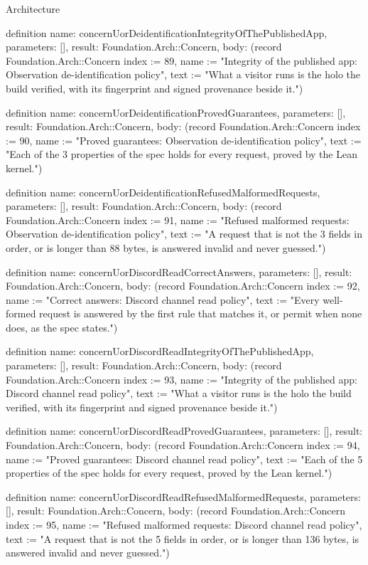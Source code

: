 \begin{lexlean}{Architecture}
\begin{semanticmodule}
definition{
  name: concernUorDeidentificationIntegrityOfThePublishedApp,
  parameters: [],
  result: Foundation.Arch::Concern,
  body: (record Foundation.Arch::Concern {index := 89, name := "Integrity of the published app: Observation de-identification policy", text := "What a visitor runs is the holo the build verified, with its fingerprint and signed provenance beside it."})
}

definition{
  name: concernUorDeidentificationProvedGuarantees,
  parameters: [],
  result: Foundation.Arch::Concern,
  body: (record Foundation.Arch::Concern {index := 90, name := "Proved guarantees: Observation de-identification policy", text := "Each of the 3 properties of the spec holds for every request, proved by the Lean kernel."})
}

definition{
  name: concernUorDeidentificationRefusedMalformedRequests,
  parameters: [],
  result: Foundation.Arch::Concern,
  body: (record Foundation.Arch::Concern {index := 91, name := "Refused malformed requests: Observation de-identification policy", text := "A request that is not the 3 fields in order, or is longer than 88 bytes, is answered invalid and never guessed."})
}

definition{
  name: concernUorDiscordReadCorrectAnswers,
  parameters: [],
  result: Foundation.Arch::Concern,
  body: (record Foundation.Arch::Concern {index := 92, name := "Correct answers: Discord channel read policy", text := "Every well-formed request is answered by the first rule that matches it, or permit when none does, as the spec states."})
}

definition{
  name: concernUorDiscordReadIntegrityOfThePublishedApp,
  parameters: [],
  result: Foundation.Arch::Concern,
  body: (record Foundation.Arch::Concern {index := 93, name := "Integrity of the published app: Discord channel read policy", text := "What a visitor runs is the holo the build verified, with its fingerprint and signed provenance beside it."})
}

definition{
  name: concernUorDiscordReadProvedGuarantees,
  parameters: [],
  result: Foundation.Arch::Concern,
  body: (record Foundation.Arch::Concern {index := 94, name := "Proved guarantees: Discord channel read policy", text := "Each of the 5 properties of the spec holds for every request, proved by the Lean kernel."})
}

definition{
  name: concernUorDiscordReadRefusedMalformedRequests,
  parameters: [],
  result: Foundation.Arch::Concern,
  body: (record Foundation.Arch::Concern {index := 95, name := "Refused malformed requests: Discord channel read policy", text := "A request that is not the 5 fields in order, or is longer than 136 bytes, is answered invalid and never guessed."})
}


\end{semanticmodule}
\end{lexlean}
